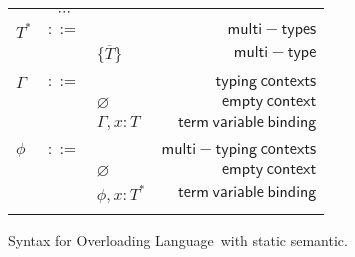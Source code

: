 \documentclass[preprint,authoryear,sort&compress,9pt,nocopyrightspace]{article}
\newcommand{\semanticD}{Overloading Language}
\newcommand{\mtP}[1]{#1^{*}}
\newcommand{\mtC}[1]{\{\overline {#1}\}}
\newcommand{\emt}{\phi}
\begin{document}
\begin{figure}
\begin{small}
\begin{center}
\begin{tabular}{|l c l r|}
\hline
&$\cdots$&&\\
$\mtP{T}$&$::=$&&$\mathsf {multi-types}$\\
&&$\mtC{T}$&$\mathsf {multi-type}$\\
&&&\\
$\Gamma$&$::=$&&$\mathsf {typing \ contexts}$\\
&&$\varnothing$&$\mathsf {empty \ context}$\\
&&$\Gamma , x:T$&$\mathsf {term \ variable \ binding}$\\
&&&\\
$\emt$&$::=$&&$\mathsf {multi-typing \ contexts}$\\
&&$\varnothing$&$\mathsf {empty \ context}$\\
&&$\emt,x: \mtP{T}$&$\mathsf {term \ variable \ binding}$\\
&&&\\
\hline
\end{tabular}
\caption{Syntax for \semanticD \ with static semantic. }
\label{tabla:sencillaA}
\end{center}
\end{small}
\end{figure}
\end{document}
